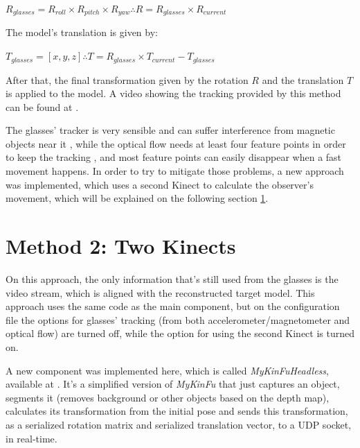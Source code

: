 \documentclass[msc, a4paper, classic, en]{ufbathesis}
\begin{document}
\begin{center}
$R_{glasses} = R_{roll} \times R_{pitch} \times R_{yaw} \therefore R =  R_{glasses} \times R_{current}$
\end{center}

The model's translation is given by:

\begin{center}
$T_{glasses} = [x, y, z] \therefore T = R_{glasses} \times T_{current} - T_{glasses}$
\end{center}

After that, the final transformation given by the rotation $R$ and the translation $T$ is applied to the model. A video showing the tracking provided by this method can be found at \cite{videos}. 

The glasses' tracker is very sensible and can suffer interference from magnetic objects near it \cite{vuzixsdk}, while the optical flow needs at least four feature points in order to keep the tracking \cite{opencvfd}, and most feature points can easily disappear when a fast movement happens. In order to try to mitigate those problems, a new approach was implemented, which uses a second Kinect to calculate the observer's movement, which will be explained on the following section \ref{sec:method2}.

\section{Method 2: Two Kinects}
\label{sec:method2}

On this approach, the only information that's still used from the glasses is the video stream, which is aligned with the reconstructed target model. This approach uses the same code as the main component, but on the configuration file the options for glasses' tracking (from both accelerometer/magnetometer and optical flow) are turned off, while the option for using the second Kinect is turned on.

A new component was implemented here, which is called \textit{MyKinFuHeadless}, available at \cite{mykinfuheadless}. It's a simplified version of \textit{MyKinFu} that just captures an object, segments it (removes background or other objects based on the depth map), calculates its transformation from the initial pose and sends this transformation, as a serialized rotation matrix and serialized translation vector, to a UDP socket, in real-time.
\end{document}
